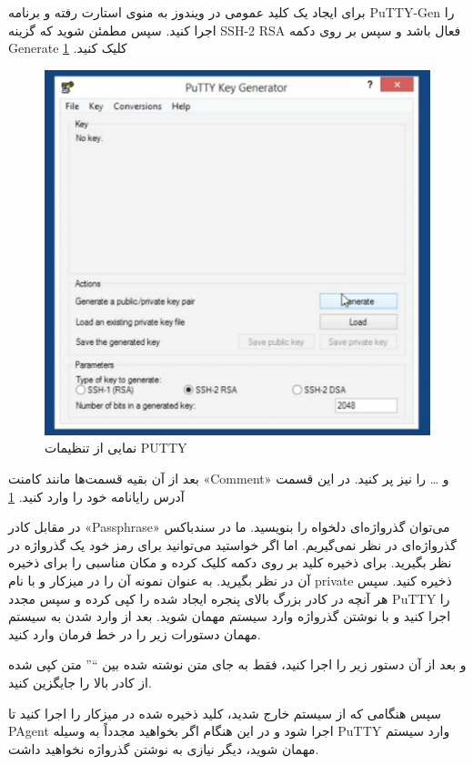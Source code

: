 برای ایجاد یک کلید عمومی در ویندوز به منوی استارت رفته و برنامه PuTTY-Gen را اجرا کنید. سپس مطمئن شوید که گزینه SSH-2 RSA فعال باشد و سپس بر روی دکمه Generate کلیک کنید.  \ref{PUTTY2}
\\
\begin{figure}
    \includegraphics[width=.89\textwidth ,height=.85\textwidth]{Pic/PUTTY2}
    \caption{ نمایی از  تنظیمات   PUTTY}
    \label{PUTTY2}
   \end{figure} 
   
بعد از آن بقیه قسمت‌ها مانند کامنت «Comment»  و … را نیز پر کنید. در این قسمت آدرس رایانامه خود را وارد کنید. \ref{PUTTY2}

در مقابل کادر «Passphrase» می‌توان گذرواژه‌ای دلخواه را بنویسید. ما در سندباکس گذرواژه‌ای در نظر نمی‌گیریم. اما اگر خواستید می‌توانید برای رمز خود یک گذرواژه در نظر بگیرید. برای ذخیره کلید بر روی دکمه 
 کلیک کرده و مکان مناسبی را برای ذخیره آن در نظر بگیرید. به عنوان نمونه آن را در میزکار و با نام private ذخیره کنید. سپس هر آنچه در کادر بزرگ بالای پنجره ایجاد شده را کپی کرده و سپس مجدد PuTTY را اجرا کنید و با نوشتن گذرواژه وارد سیستم مهمان شوید. بعد از وارد شدن به سیستم مهمان دستورات زیر را در خط فرمان وارد کنید. 
\begin{latin}
    
\end{latin}
و بعد از آن دستور زیر را اجرا کنید، فقط به جای متن نوشته شده بین “” متن کپی شده از کادر بالا را جایگزین کنید.
\begin{latin}
    
\end{latin}
سپس هنگامی که از سیستم خارج شدید، کلید ذخیره شده در میزکار را اجرا کنید تا PAgent اجرا شود و در این هنگام اگر بخواهید مجدداً به وسیله PuTTY وارد سیستم مهمان شوید، دیگر نیازی به نوشتن گذرواژه نخواهید داشت.
